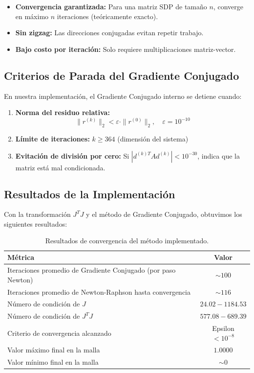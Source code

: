 \documentclass[11pt,letterpaper]{article}
\begin{document}
\begin{itemize}
    \item \textbf{Convergencia garantizada:} Para una matriz SDP de tamaño $n$, converge en máximo $n$ iteraciones (teóricamente exacto).
    \item \textbf{Sin zigzag:} Las direcciones conjugadas evitan repetir trabajo.
    \item \textbf{Bajo costo por iteración:} Solo requiere multiplicaciones matriz-vector.
\end{itemize}

\subsection{Criterios de Parada del Gradiente Conjugado}

En nuestra implementación, el Gradiente Conjugado interno se detiene cuando:

\begin{enumerate}
    \item \textbf{Norma del residuo relativa:}
    \[
    \|r^{(k)}\|_2 < \varepsilon \cdot \|r^{(0)}\|_2, \quad \varepsilon = 10^{-10}
    \]
    
    \item \textbf{Límite de iteraciones:} $k \geq 364$ (dimensión del sistema)
    
    \item \textbf{Evitación de división por cero:} Si $|d^{(k)T} A d^{(k)}| < 10^{-30}$, indica que la matriz está mal condicionada.
\end{enumerate}

\subsection{Resultados de la Implementación}

Con la transformación $J^T J$ y el método de Gradiente Conjugado, obtuvimos los siguientes resultados:

\begin{table}[H]
\centering
\begin{tabular}{|l|c|}
\hline
\textbf{Métrica} & \textbf{Valor} \\
\hline
Iteraciones promedio de Gradiente Conjugado (por paso Newton) & $\sim 100$ \\
Iteraciones promedio de Newton-Raphson hasta convergencia & $\sim 116$ \\
Número de condición de $J$ & $24.02 - 1184.53$ \\
Número de condición de $J^T J$ & $577.08 - 689.39$ \\
Criterio de convergencia alcanzado & Epsilon $< 10^{-8}$ \\
Valor máximo final en la malla & $1.0000$ \\
Valor mínimo final en la malla & $\sim 0$ \\
\hline
\end{tabular}
\caption{Resultados de convergencia del método implementado.}
\end{table}
\end{document}
